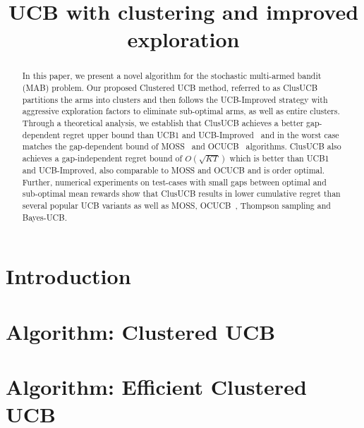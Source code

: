 \documentclass{article}
\title{UCB with clustering and improved exploration}
\begin{document}

\maketitle

\begin{abstract}
In this paper, we present a novel algorithm for the stochastic multi-armed bandit (MAB) problem. Our proposed Clustered UCB method, referred to as ClusUCB partitions the arms into clusters and then follows the UCB-Improved strategy with aggressive exploration factors to eliminate sub-optimal arms, as well as entire clusters. Through a theoretical analysis, we establish that ClusUCB achieves a better gap-dependent regret upper bound than UCB1 and UCB-Improved~\cite{auer2010ucb} and in the worst case matches the gap-dependent bound of MOSS~\cite{audibert2009minimax} and OCUCB~\cite{lattimore2016optimally}  algorithms. ClusUCB also achieves a gap-independent regret bound of $O\left(\sqrt{KT}\right)$ which is better than UCB1 and UCB-Improved, also comparable to MOSS and OCUCB and is order optimal. Further, numerical experiments on test-cases with small gaps between optimal and sub-optimal mean rewards show that ClusUCB results in lower cumulative regret than several popular UCB variants as well as MOSS, OCUCB~\cite{lattimore2015optimally}, Thompson sampling and Bayes-UCB\cite{kaufmann2012bayesian}. 

\end{abstract}

\section{Introduction}
\label{sec:intro}


\section{Algorithm: Clustered UCB}
\label{sec:clusucb}


\section{Algorithm: Efficient Clustered UCB}
\label{sec:eclusucb}

\end{document}
